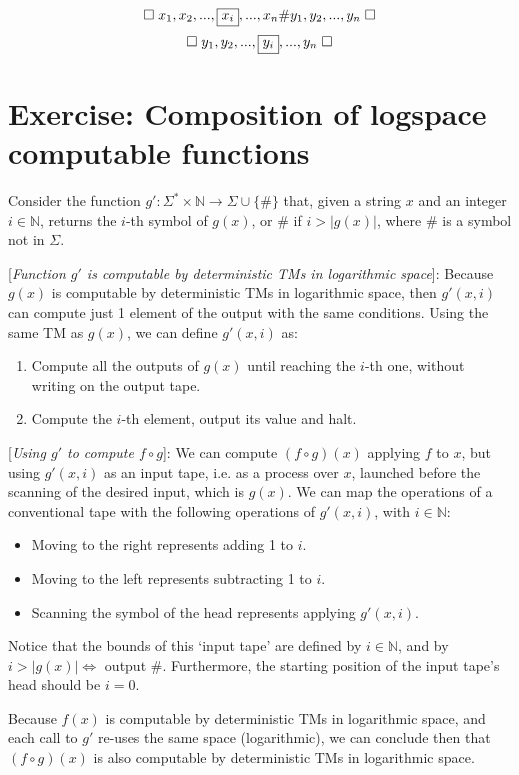 \documentclass[a4paper, 10pt]{article}
\begin{document}
\[
    \square \hspace{1mm} x_1,x_2,...,\boxed{x_i},...,x_n \# y_1,y_2,...,y_n \hspace{1mm} \square
\]
\[
    \square \hspace{1mm} y_1,y_2,...,\boxed{y_i},...,y_n \hspace{1mm} \square   
\]

\section{Exercise: Composition of logspace computable functions}
Consider the function $g':\Sigma^* \times \mathbb{N} \rightarrow \Sigma \cup \{\#\}$ that, given a string $x$ and an integer $i \in \mathbb{N}$, returns the $i$-th symbol of $g(x)$, or $\#$ if $i > |g(x)|$, where $\#$ is a symbol not in $\Sigma$. 

[\textit{Function $g'$ is computable by deterministic TMs in logarithmic space}]: Because $g(x)$ is computable by deterministic TMs in logarithmic space, then $g'(x,i)$ can compute just 1 element of the output with the same conditions. Using the same TM as $g(x)$, we can define $g'(x,i)$ as:
\begin{enumerate}
    \item Compute all the outputs of $g(x)$ until reaching the $i$-th one, without writing on the output tape.
    \item Compute the $i$-th element, output its value and halt.
\end{enumerate}

[\textit{Using $g'$ to compute $f \circ g$}]: We can compute $(f \circ g)(x)$ applying $f$ to $x$, but using $g'(x,i)$ as an input tape, i.e. as a process over $x$, launched before the scanning of the desired input, which is $g(x)$. We can map the operations of a conventional tape with the following operations of $g'(x,i)$, with $i \in \mathbb{N}$:
\begin{itemize}
    \item Moving to the right represents adding 1 to $i$.
    \item Moving to the left represents subtracting 1 to $i$.
    \item Scanning the symbol of the head represents applying $g'(x,i)$.
\end{itemize}
Notice that the bounds of this `input tape' are defined by $i \in \mathbb{N}$, and by $i > |g(x)| \Leftrightarrow$ output $\#$. Furthermore, the starting position of the input tape's head should be $i = 0$. 

Because $f(x)$ is computable by deterministic TMs in logarithmic space, and each call to $g'$ re-uses the same space (logarithmic), we can conclude then that  $(f \circ g)(x)$ is also computable by deterministic TMs in logarithmic space.

%

\newpage


\end{document}
